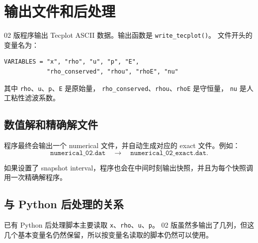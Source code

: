 \section{输出文件和后处理}

02 版程序输出 Tecplot ASCII 数据。输出函数是 \texttt{write\_tecplot()}。
文件开头的变量名为：
\begin{lstlisting}
VARIABLES = "x", "rho", "u", "p", "E",
            "rho_conserved", "rhou", "rhoE", "nu"
\end{lstlisting}

其中 \texttt{rho}、\texttt{u}、\texttt{p}、\texttt{E} 是原始量，
\texttt{rho\_conserved}、\texttt{rhou}、\texttt{rhoE} 是守恒量，
\texttt{nu} 是人工粘性滤波系数。

\subsection{数值解和精确解文件}

程序最终会输出一个 numerical 文件，并自动生成对应的 exact 文件。例如：
\[
\texttt{numerical\_02.dat}
\quad\rightarrow\quad
\texttt{numerical\_02\_exact.dat}.
\]

如果设置了 snapshot interval，程序也会在中间时刻输出快照，并且为每个快照调用一次精确解程序。

\subsection{与 Python 后处理的关系}

已有 Python 后处理脚本主要读取 \texttt{x}、\texttt{rho}、\texttt{u}、\texttt{p}。
02 版虽然多输出了几列，但这几个基本变量名仍然保留，所以按变量名读取的脚本仍然可以使用。
